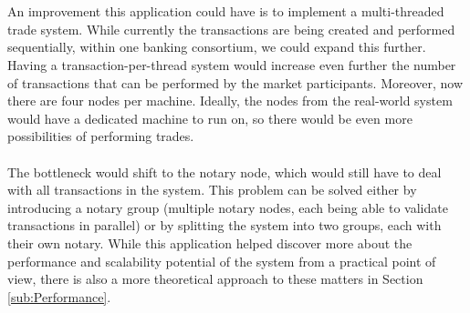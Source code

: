 \documentclass[12pt,twoside]{article}
\begin{document}
\\ \\
An improvement this application could have is to implement a multi-threaded trade system. While currently the transactions are being created and performed sequentially, within one banking consortium, we could expand this further. Having a transaction-per-thread system would increase even further the number of transactions that can be performed by the market participants. Moreover, now there are four nodes per machine. Ideally, the nodes from the real-world system would have a dedicated machine to run on, so there would be even more possibilities of performing trades.
\\ \\
The bottleneck would shift to the notary node, which would still have to deal with all transactions in the system. This problem can be solved either by introducing a notary group (multiple notary nodes, each being able to validate transactions in parallel) or by splitting the system into two groups, each with their own notary. While this application helped discover more about the performance and scalability potential of the system from a practical point of view, there is also a more theoretical approach to these matters in Section \ref{sub:Performance}.
\end{document}
